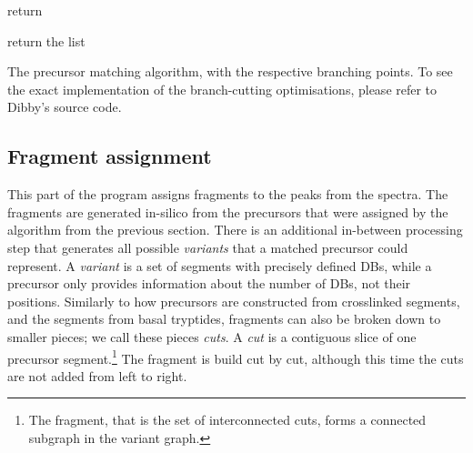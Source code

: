 \begin{algorithm}
  \begin{algorithmic}

    \label{alg:findprec:combinations} 
    \EndIf

    \State return  
    \EndIf

    \label{alg:findprec:end}
    \EndFor
    \EndIf


    \label{alg:findprec:elongate}

    \State return the list 
    \EndFunction
  \end{algorithmic}
  \caption{The precursor matching algorithm, with the respective branching points. To see the exact implementation of the branch-cutting optimisations, please refer to Dibby's source code.}\label{alg:findprec}
\end{algorithm}

\subsection{Fragment assignment}

This part of the program assigns fragments to the peaks from the spectra. The fragments are generated in-silico from the precursors that were assigned by the algorithm from the previous section. There is an additional in-between processing step that generates all possible \emph{variants} that a matched precursor could represent. A \emph{variant} is a set of segments with precisely defined DBs, while a precursor only provides information about the number of DBs, not their positions. Similarly to how precursors are constructed from crosslinked segments, and the segments from basal tryptides, fragments can also be broken down to smaller pieces; we call these pieces \emph{cuts}. A \emph{cut} is a contiguous slice of one precursor segment.\footnote{The fragment, that is the set of interconnected cuts, forms a connected subgraph in the variant graph.} The fragment is build cut by cut, although this time the cuts are not added from left to right.

